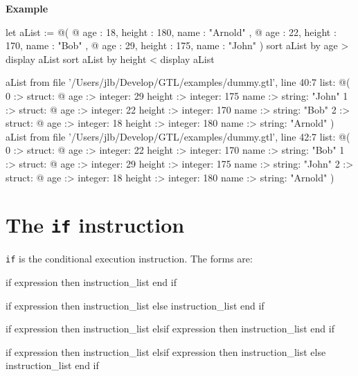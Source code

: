 \documentclass[10pt,openright,twosides,final]{memoir}
\newcommand{\gtlinline}[1]{\colorbox{light-blue}{\lstinline[language=gtl]{#1}}}
\newcommand{\example}{\vspace{.75em}\noindent\textbf{Example}\vspace{0em}}
\begin{document}
\example
\begin{gtl}
let aList := @(
  @{ age : 18, height : 180, name : "Arnold" },
  @{ age : 22, height : 170, name : "Bob"    },
  @{ age : 29, height : 175, name : "John"   }
)
sort aList by age >
display aList
sort aList by height <
display aList
\end{gtl}
\begin{console}
aList from file '/Users/jlb/Develop/GTL/examples/dummy.gtl', line 40:7
    list: @(
        0 :>
            struct: @{
                age :>
                    integer: 29
                height :>
                    integer: 175
                name :>
                    string: "John"
            }
        1 :>
            struct: @{
                age :>
                    integer: 22
                height :>
                    integer: 170
                name :>
                    string: "Bob"
            }
        2 :>
            struct: @{
                age :>
                    integer: 18
                height :>
                    integer: 180
                name :>
                    string: "Arnold"
            }
    )
aList from file '/Users/jlb/Develop/GTL/examples/dummy.gtl', line 42:7
    list: @(
        0 :>
            struct: @{
                age :>
                    integer: 22
                height :>
                    integer: 170
                name :>
                    string: "Bob"
            }
        1 :>
            struct: @{
                age :>
                    integer: 29
                height :>
                    integer: 175
                name :>
                    string: "John"
            }
        2 :>
            struct: @{
                age :>
                    integer: 18
                height :>
                    integer: 180
                name :>
                    string: "Arnold"
            }
    )
\end{console}

\section{The \texttt{if} instruction}

\gtlinline{if} is the conditional execution instruction. The forms are:

\begin{gtl}
if expression then
  instruction_list
end if

if expression then
  instruction_list
else
  instruction_list
end if

if expression then
  instruction_list
elsif expression then
  instruction_list
end if

if expression then
  instruction_list
elsif expression then
  instruction_list
else
  instruction_list
end if
\end{gtl}    
\end{document}

